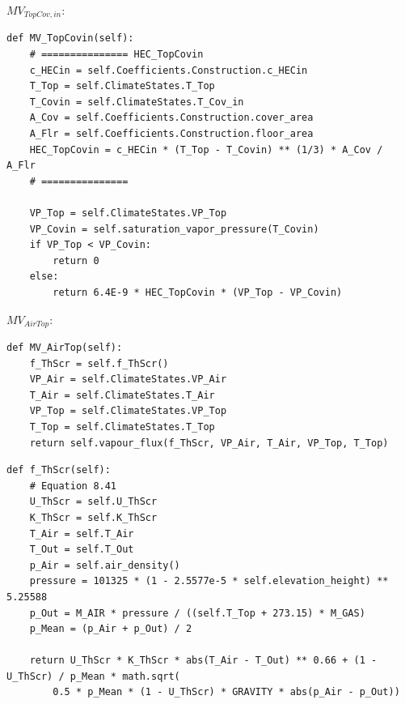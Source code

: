 \documentclass[a4paper]{article}
\numberwithin{equation}{section}
\begin{document}
\(MV_{TopCov,in}\):
\begin{mdframed}[leftline=false,rightline=false,backgroundcolor=magenta!10,nobreak=true]
  \begin{verbatim}
def MV_TopCovin(self):
    # =============== HEC_TopCovin
    c_HECin = self.Coefficients.Construction.c_HECin
    T_Top = self.ClimateStates.T_Top
    T_Covin = self.ClimateStates.T_Cov_in
    A_Cov = self.Coefficients.Construction.cover_area
    A_Flr = self.Coefficients.Construction.floor_area
    HEC_TopCovin = c_HECin * (T_Top - T_Covin) ** (1/3) * A_Cov / A_Flr
    # ===============

    VP_Top = self.ClimateStates.VP_Top
    VP_Covin = self.saturation_vapor_pressure(T_Covin)
    if VP_Top < VP_Covin:
        return 0
    else:
        return 6.4E-9 * HEC_TopCovin * (VP_Top - VP_Covin)
  \end{verbatim}
\end{mdframed}

\(MV_{AirTop}\):
\begin{mdframed}[leftline=false,rightline=false,backgroundcolor=magenta!10,nobreak=true]
  \begin{verbatim}
def MV_AirTop(self):
    f_ThScr = self.f_ThScr()
    VP_Air = self.ClimateStates.VP_Air
    T_Air = self.ClimateStates.T_Air
    VP_Top = self.ClimateStates.VP_Top
    T_Top = self.ClimateStates.T_Top
    return self.vapour_flux(f_ThScr, VP_Air, T_Air, VP_Top, T_Top)
  \end{verbatim}
\end{mdframed}
\begin{mdframed}[leftline=false,rightline=false,backgroundcolor=magenta!10,nobreak=true]
  \begin{verbatim}
def f_ThScr(self):
    # Equation 8.41
    U_ThScr = self.U_ThScr
    K_ThScr = self.K_ThScr
    T_Air = self.T_Air
    T_Out = self.T_Out
    p_Air = self.air_density()
    pressure = 101325 * (1 - 2.5577e-5 * self.elevation_height) ** 5.25588
    p_Out = M_AIR * pressure / ((self.T_Top + 273.15) * M_GAS)
    p_Mean = (p_Air + p_Out) / 2

    return U_ThScr * K_ThScr * abs(T_Air - T_Out) ** 0.66 + (1 - U_ThScr) / p_Mean * math.sqrt(
        0.5 * p_Mean * (1 - U_ThScr) * GRAVITY * abs(p_Air - p_Out))
  \end{verbatim}
\end{mdframed}
\end{document}
